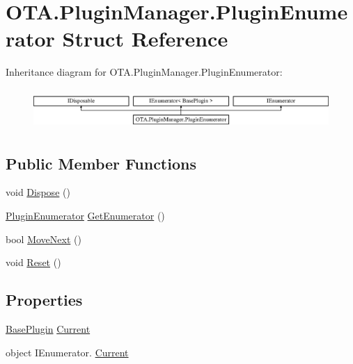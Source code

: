 \hypertarget{struct_o_t_a_1_1_plugin_manager_1_1_plugin_enumerator}{}\section{O\+T\+A.\+Plugin\+Manager.\+Plugin\+Enumerator Struct Reference}
\label{struct_o_t_a_1_1_plugin_manager_1_1_plugin_enumerator}
Inheritance diagram for O\+T\+A.\+Plugin\+Manager.\+Plugin\+Enumerator\+:\begin{figure}[H]
\begin{center}
\leavevmode
\includegraphics[height=1.555556cm]{struct_o_t_a_1_1_plugin_manager_1_1_plugin_enumerator}
\end{center}
\end{figure}
\subsection*{Public Member Functions}
\begin{DoxyCompactItemize}
\item 
void \hyperlink{struct_o_t_a_1_1_plugin_manager_1_1_plugin_enumerator_a55c04c3e824cbcd48a12ff9ef26c4649}{Dispose} ()
\item 
\hyperlink{struct_o_t_a_1_1_plugin_manager_1_1_plugin_enumerator}{Plugin\+Enumerator} \hyperlink{struct_o_t_a_1_1_plugin_manager_1_1_plugin_enumerator_a09ed5716f68d67b2485dbac43621ba59}{Get\+Enumerator} ()
\item 
bool \hyperlink{struct_o_t_a_1_1_plugin_manager_1_1_plugin_enumerator_aad3f88dc2983408d027d4d8fd2f71628}{Move\+Next} ()
\item 
void \hyperlink{struct_o_t_a_1_1_plugin_manager_1_1_plugin_enumerator_ae6f28cbf419d5ca7439eabf3a39683ad}{Reset} ()
\end{DoxyCompactItemize}
\subsection*{Properties}
\begin{DoxyCompactItemize}
\item 
\hyperlink{class_o_t_a_1_1_plugin_1_1_base_plugin}{Base\+Plugin} \hyperlink{struct_o_t_a_1_1_plugin_manager_1_1_plugin_enumerator_a926f9f62570b998e2719a03a47977e3c}{Current}
\item 
object I\+Enumerator. \hyperlink{struct_o_t_a_1_1_plugin_manager_1_1_plugin_enumerator_a33f4e51d228051584fc3e87183be32ac}{Current}
\end{DoxyCompactItemize}


